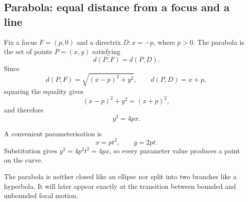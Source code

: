 \subsection{Parabola: equal distance from a focus and a line}

Fix a focus $F=(p,0)$ and a directrix $D:x=-p$, where $p>0$. The parabola is the
set of points $P=(x,y)$ satisfying
\[
\boxed{d(P,F)=d(P,D)}.
\]
Since
\[
d(P,F)=\sqrt{(x-p)^2+y^2},
\qquad
d(P,D)=x+p,
\]
squaring the equality gives
\[
(x-p)^2+y^2=(x+p)^2,
\]
and therefore
\[
\boxed{y^2=4px}.
\]

\begin{center}
\end{center}

A convenient parameterisation is
\[
\boxed{x=pt^2,\qquad y=2pt}.
\]
Substitution gives $y^2=4p^2t^2=4px$, so every parameter value produces a point
on the curve.

\begin{interpretationbox}
The parabola is neither closed like an ellipse nor split into two branches like
a hyperbola. It will later appear exactly at the transition between bounded and
unbounded focal motion.
\end{interpretationbox}
